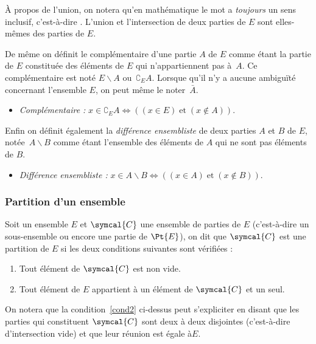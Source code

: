 À propos de l'union, on notera qu'en mathématique le mot  a \emph{toujours} un sens inclusif, c'est-à-dire . L'union et l'intersection de deux parties de $E$ sont elles-mêmes des parties de $E$.

De même on définit le complémentaire d'une partie $A$ de $E$ comme étant la partie de $E$ constituée des éléments de $E$ qui n'appartiennent pas à~$A$. Ce complémentaire est noté $E\smallsetminus A$ ou~$\complement_{E} A$. Lorsque qu'il n'y a aucune ambiguïté concernant l'ensemble $E$, on peut même le noter~$\bar{A}$.
\smallskip\par
\begin{itemize}
\item\textit{Complémentaire :} $x\in \complement_E A \iff ((x\in E)\;\text{et}\;(x\notin A))$.
\end{itemize}

\smallskip
Enfin on définit également la \emph{différence ensembliste} de deux parties $A$ et $B$ de $E$, notée~$A\smallsetminus B$ comme étant l'ensemble des éléments de $A$ qui ne sont pas éléments de $B$.
\smallskip\par
\begin{itemize}
\item\textit{Différence ensembliste :} $x\in A\smallsetminus B \iff ((x\in A)\;\text{et}\;(x\notin B))$.
\end{itemize}

\subsubsection{Partition d'un ensemble}
Soit un ensemble $E$  et $\symcal{C}$ une ensemble de parties de $E$ (c'est-à-dire un sous-ensemble ou encore une partie de $\Pt{E}$), on dit que $\symcal{C}$ est une partition de $E$ si les deux conditions suivantes sont vérifiées :
\begin{enumerate}
\item Tout élément de $\symcal{C}$ est non vide.
\item Tout élément de $E$ appartient à  un élément de $\symcal{C}$ et un seul.\label{cond2}
\end{enumerate}

\begin{remark}On notera que la condition~\ref{cond2} ci-dessus peut s'expliciter en disant que les parties qui constituent $\symcal{C}$ sont deux à deux disjointes (c'est-à-dire d'intersection vide) et que leur réunion est égale à$E$.
\end{remark}

